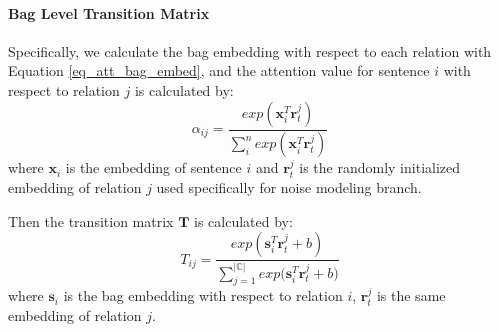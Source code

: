 \paragraph{Bag Level Transition Matrix}
 Specifically, we calculate the bag embedding with respect to each relation with Equation \ref{eq_att_bag_embed}, and the attention value for sentence $i$ with respect to relation $j$ is calculated by:
\begin{equation}
\alpha_{ij} = \frac{exp(\mathbf{x}_i^T \mathbf{r}_t^j)}{\sum_i^n{exp(\mathbf{x}_i^T \mathbf{r}_t^j)}}
\end{equation}
where $\mathbf{x}_i$ is the embedding of sentence $i$ and $\mathbf{r}_t^j$ is the randomly initialized embedding of relation $j$ used specifically for noise modeling branch.

Then the transition matrix $\mathbf{T}$ is calculated by:
\begin{equation}
T_{ij} = \frac{exp({\mathbf{s}_i^T \mathbf{r}_t^j  + b})}{\sum_{j=1}^{|\mathbb{C}|}{exp(\mathbf{s}_i^T \mathbf{r}_t^j + b})}
\end{equation}
where $\mathbf{s}_i$ is the bag embedding with respect to relation $i$, $\mathbf{r}_t^j$ is the same embedding of relation $j$.


